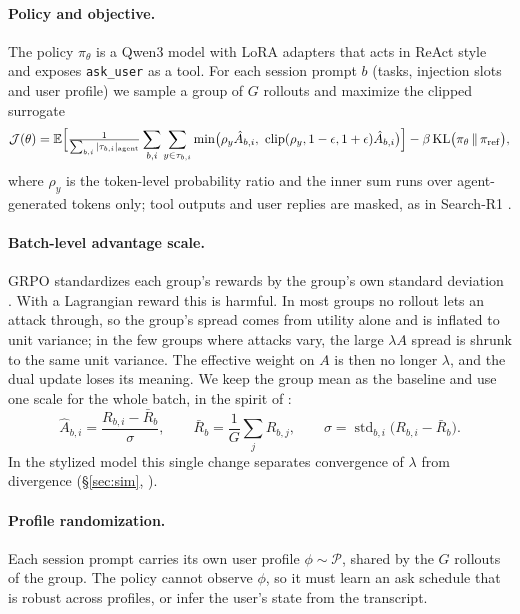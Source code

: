 \documentclass[10pt]{article}
\newcommand{\E}{\mathbb{E}}
\theoremstyle{plain}
\theoremstyle{definition}
\begin{document}
\paragraph{Policy and objective.} The policy $\pi_\theta$ is a Qwen3 model \citep{yang2025qwen3} with LoRA adapters \citep{hu2022lora} that acts in ReAct style and exposes \texttt{ask\_user} as a tool. For each session prompt $b$ (tasks, injection slots and user profile) we sample a group of $G$ rollouts and maximize the clipped surrogate
\begin{equation}\label{eq:grpo}
\mathcal{J}(\theta)=\E\Bigl[\tfrac{1}{\sum_{b,i}|\tau_{b,i}|_{\mathrm{agent}}}\sum_{b,i}\sum_{y\in\tau_{b,i}}\min\bigl(\rho_y\hat A_{b,i},\ \mathrm{clip}(\rho_y,1-\epsilon,1+\epsilon)\hat A_{b,i}\bigr)\Bigr]-\beta\,\mathrm{KL}\bigl(\pi_\theta\,\|\,\pi_{\mathrm{ref}}\bigr),
\end{equation}
where $\rho_y$ is the token-level probability ratio and the inner sum runs over agent-generated tokens only; tool outputs and user replies are masked, as in Search-R1 \citep{jin2025searchr1}.

\paragraph{Batch-level advantage scale.} GRPO standardizes each group's rewards by the group's own standard deviation \citep{shao2024deepseekmath}. With a Lagrangian reward this is harmful. In most groups no rollout lets an attack through, so the group's spread comes from utility alone and is inflated to unit variance; in the few groups where attacks vary, the large $\lambda A$ spread is shrunk to the same unit variance. The effective weight on $A$ is then no longer $\lambda$, and the dual update loses its meaning. We keep the group mean as the baseline and use one scale for the whole batch, in the spirit of \citet{liu2025drgrpo}:
\begin{equation}\label{eq:adv}
\hat A_{b,i}=\frac{R_{b,i}-\bar R_b}{\sigma},\qquad \bar R_b=\frac1G\sum_{j}R_{b,j},\qquad \sigma=\operatorname{std}_{b,i}\bigl(R_{b,i}-\bar R_b\bigr).
\end{equation}
In the stylized model this single change separates convergence of $\lambda$ from divergence (\S\ref{sec:sim}, ).

\paragraph{Profile randomization.} Each session prompt carries its own user profile $\phi\sim\mathcal{P}$, shared by the $G$ rollouts of the group. The policy cannot observe $\phi$, so it must learn an ask schedule that is robust across profiles, or infer the user's state from the transcript.
\end{document}

